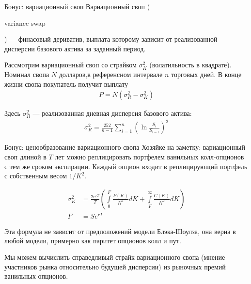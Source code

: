 \documentclass{beamer}
\newcommand{\en}[1]{\begin{otherlanguage}{english}#1\end{otherlanguage}}
\begin{document}
\begin{frame}{Бонус: вариационный своп}
\justify
\alert{Вариационный своп} (\en{variance swap}) --- финасовый дериватив, выплата которому зависит от реализованной дисперсии базового актива за заданный период.

\justify
Рассмотрим вариационный своп со страйком $\sigma_K^2$ (волатильность в квадрате). Номинал свопа $N$ долларов,в референсном интервале $n$ торговых дней. В конце жизни свопа покупатель получит выплату
\begin{align*}
P = N(\sigma_R^2 - \sigma_K^2)
\end{align*}

Здесь $\sigma_R^2$ --- реализованная дневная дисперсия базового актива:
\begin{align*}
\sigma_R^2 = \frac{252}{n-1}\sum\limits_{i=1}^{n}\left(\ln\frac{S_i}{S_{i-1}}\right)^2
\end{align*}
\end{frame}



\begin{frame}{Бонус: ценообразование вариационного свопа}
\justify
Хозяйке на заметку: вариационный своп длиной в $T$ лет можно реплицировать портфелем ванильных колл-опционов с тем же сроком экспирации. Каждый опцион входит в реплицирующий портфель с собственным весом $1/K^2$.

\begin{align*}
\sigma^2_K &= \frac{2e^{rT}}{T}\left(
\int\limits_{0}^{F}\frac{P(K)}{K^2}dK + 
\int\limits_{F}^{\infty}\frac{C(K)}{K^2}dK
\right) \\
F &= Se^{rT}
\end{align*}

\justify
Эта формула не зависит от предположений модели Блэка-Шоулза, она верна в любой модели, примерно как паритет опционов колл и пут.

\justify
Мы можем вычислить справедливый страйк вариационного свопа (мнение участников рынка относительно будущей дисперсии) из рыночных премий ванильных опционов.
\end{frame}
\end{document}
